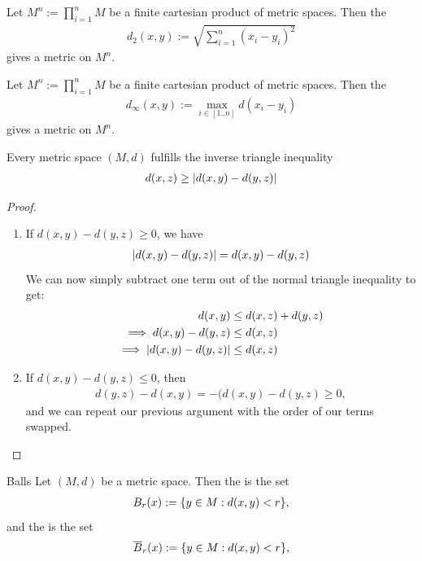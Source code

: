 \begin{theorem}
	\label{th:euclideanmetric}
	Let $M^n := \prod_{i = 1}^n M$ be a finite cartesian product of metric spaces. Then the 
	\begin{align*}
		d_2(x,y) := \sqrt{\sum_{i = 1}^n (x_i - y_i)^2}
	\end{align*}
	gives a metric on $M^n$.
\end{theorem}
\begin{theorem}
	\label{th:chebyshevmetric}
	Let $M^n := \prod_{i = 1}^n M$ be a finite cartesian product of metric spaces. Then the 
	\begin{align*}
		d_\infty(x,y) := \max_{i \in [1..n]} d(x_i - y_i)
	\end{align*}
	gives a metric on $M^n$.
\end{theorem}
\begin{theorem}
	\label{th:reversetriangleinequality}
	Every metric space $(M,d)$ fulfills the inverse triangle inequality
	\begin{align*}
		d(x,z) \geq \abs{d(x,y) - d(y,z)}
	\end{align*}
\end{theorem}
\begin{proof}
	\begin{enumerate}
		\item If $d(x,y) - d(y,z) \geq 0$, we have 
		\begin{align*}
			\abs{d(x,y) - d(y,z)} = d(x,y) - d(y,z)
		\end{align*}
		We can now simply subtract one term out of the normal triangle inequality to get:
		\begin{align*}
			d(x,y) &\leq d(x,z) + d(y,z)\\
			\implies d(x,y) - d(y,z) &\leq d(x,z)\\
			\implies \abs{d(x,y) - d(y,z)} &\leq d(x,z)\\
		\end{align*}
		\item If $d(x,y) - d(y,z) \leq 0$, then
		\begin{align*}
			d(y,z) - d(x,y) = -(d(x,y) - d(y,z) \geq 0,
		\end{align*} 
		and we can repeat our previous argument with the order of our terms swapped.
	\end{enumerate}
\end{proof}
\begin{importantdefinition}{Balls}{}
	Let $(M,d)$ be a metric space. Then the  is the set
	\begin{align*}
		B_r(x) := \qty{y \in M : d(x,y) < r},
	\end{align*}
	and the  is the set
	\begin{align*}
		\overline{{B}}_r(x) := \qty{y \in M : d(x,y) < r},
	\end{align*}
\end{importantdefinition}
